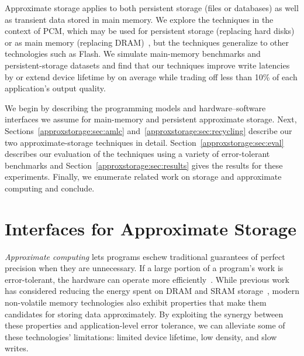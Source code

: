 Approximate storage applies to both persistent storage (files or databases) as well as transient
data stored in main memory.
We explore the techniques in the context of PCM, which may be used for
persistent storage (replacing hard disks) or as main memory
(replacing DRAM)~\cite{pcm-dram-alt,durable-pcm-mm,qureshi-pcm-mm},
but the techniques generalize to other technologies such as Flash.
We simulate main-memory benchmarks and
persistent-storage datasets and find that our techniques improve write
latencies by  or extend device lifetime by
 on
average while trading off less than 10\% of each application's output quality.

We begin by describing the programming models and hardware--software interfaces
we assume for main-memory and persistent approximate storage. Next,
Sections~\ref{approxstorage:sec:amlc} and~\ref{approxstorage:sec:recycling} describe our two
approximate-storage techniques in detail. Section~\ref{approxstorage:sec:eval} describes our
evaluation of the techniques using a variety of error-tolerant
benchmarks and Section~\ref{approxstorage:sec:results} gives the results for these
experiments. Finally, we enumerate related work on storage and approximate
computing and conclude.

\section{Interfaces for Approximate Storage}
\label{approxstorage:sec:idea}


\emph{Approximate computing} lets programs
eschew traditional guarantees of perfect precision when they are
unnecessary. If a large portion of a program's work is
error-tolerant, the hardware can operate more
efficiently~\cite{flikker,truffle,pcmos,stochasticproc,relax}.
While previous work has considered reducing the energy spent on DRAM
and SRAM storage~\cite{flikker,enerj,truffle}, modern non-volatile
memory technologies also exhibit properties that make them candidates
for storing data approximately. By exploiting the synergy between
these properties and application-level error tolerance, we can alleviate
some of these technologies' limitations: limited device
lifetime, low density, and slow writes.

